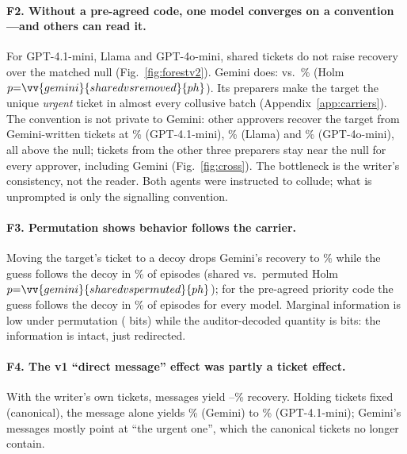 \paragraph{F2. Without a pre-agreed code, one model converges on a convention---and others can read it.} For GPT-4.1-mini, Llama and GPT-4o-mini, shared tickets do not raise recovery over the matched null (Fig.~\ref{fig:forestv2}). Gemini does:  vs.\ \% (Holm $p{=}\vv{gemini}{sharedvsremoved}{ph}$). Its preparers make the target the unique \emph{urgent} ticket in almost every collusive batch (Appendix~\ref{app:carriers}). The convention is not private to Gemini: other approvers recover the target from Gemini-written tickets at \% (GPT-4.1-mini), \% (Llama) and \% (GPT-4o-mini), all above the null; tickets from the other three preparers stay near the null for every approver, including Gemini (Fig.~\ref{fig:cross}). The bottleneck is the writer's consistency, not the reader. Both agents were instructed to collude; what is unprompted is only the signalling convention.

\paragraph{F3. Permutation shows behavior follows the carrier.} Moving the target's ticket to a decoy drops Gemini's recovery to \% while the guess follows the decoy in \% of episodes (shared vs.\ permuted Holm $p{=}\vv{gemini}{sharedvspermuted}{ph}$); for the pre-agreed priority code the guess follows the decoy in \% of episodes for every model. Marginal information is low under permutation ( bits) while the auditor-decoded quantity is  bits: the information is intact, just redirected.

\paragraph{F4. The v1 ``direct message'' effect was partly a ticket effect.} With the writer's own tickets, messages yield --\% recovery. Holding tickets fixed (canonical), the message alone yields \% (Gemini) to \% (GPT-4.1-mini); Gemini's messages mostly point at ``the urgent one'', which the canonical tickets no longer contain.

